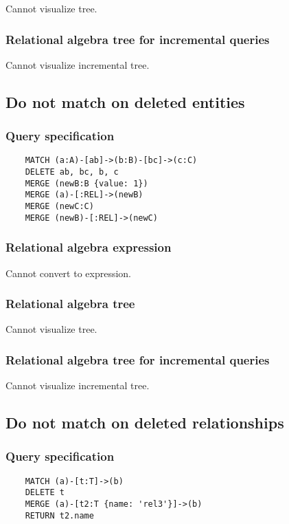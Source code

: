 	Cannot visualize tree.

	\subsubsection*{Relational algebra tree for incremental queries}

	Cannot visualize incremental tree.
	\subsection{Do not match on deleted entities}

	\subsubsection*{Query specification}

	\begin{lstlisting}
	MATCH (a:A)-[ab]->(b:B)-[bc]->(c:C)
	DELETE ab, bc, b, c
	MERGE (newB:B {value: 1})
	MERGE (a)-[:REL]->(newB)
	MERGE (newC:C)
	MERGE (newB)-[:REL]->(newC)
	\end{lstlisting}


	\subsubsection*{Relational algebra expression}

	Cannot convert to expression.

	\subsubsection*{Relational algebra tree}

	Cannot visualize tree.

	\subsubsection*{Relational algebra tree for incremental queries}

	Cannot visualize incremental tree.
	\subsection{Do not match on deleted relationships}

	\subsubsection*{Query specification}

	\begin{lstlisting}
	MATCH (a)-[t:T]->(b)
	DELETE t
	MERGE (a)-[t2:T {name: 'rel3'}]->(b)
	RETURN t2.name
	\end{lstlisting}


